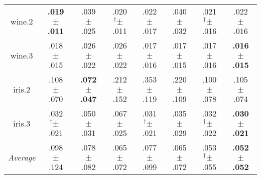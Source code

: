 \begin{tabular}{|c|ccccccc|}
wine.2 & \textbf{.019$^{\phantom{\dag}}\pm^{\phantom{\dag}}$.011}\cellcolor{green!40} & .039$^{\phantom{\dag}}\pm^{\phantom{\dag}}$.025\cellcolor{red!35} & .020$^{\dag}\pm^{\phantom{\dag}}$.011\cellcolor{green!35} & .022$^{\phantom{\dag}}\pm^{\phantom{\dag}}$.017\cellcolor{green!29} & .040$^{\phantom{\dag}}\pm^{\phantom{\dag}}$.032\cellcolor{red!40} & .021$^{\dag}\pm^{\phantom{\dag}}$.016\cellcolor{green!30} & .022$^{\phantom{\dag}}\pm^{\phantom{\dag}}$.016\cellcolor{green!27} \\
wine.3 & .018$^{\phantom{\dag}}\pm^{\phantom{\dag}}$.015\cellcolor{green!17} & .026$^{\phantom{\dag}}\pm^{\phantom{\dag}}$.022\cellcolor{red!40} & .026$^{\phantom{\dag}}\pm^{\phantom{\dag}}$.022\cellcolor{red!40} & .017$^{\phantom{\dag}}\pm^{\phantom{\dag}}$.016\cellcolor{green!26} & .017$^{\phantom{\dag}}\pm^{\phantom{\dag}}$.015\cellcolor{green!26} & .017$^{\phantom{\dag}}\pm^{\phantom{\dag}}$.016\cellcolor{green!26} & \textbf{.016$^{\phantom{\dag}}\pm^{\phantom{\dag}}$.015}\cellcolor{green!40} \\
iris.2 & .108$^{\phantom{\dag}}\pm^{\phantom{\dag}}$.070\cellcolor{green!29} & \textbf{.072$^{\phantom{\dag}}\pm^{\phantom{\dag}}$.047}\cellcolor{green!40} & .212$^{\phantom{\dag}}\pm^{\phantom{\dag}}$.152\cellcolor{green!0} & .353$^{\phantom{\dag}}\pm^{\phantom{\dag}}$.119\cellcolor{red!40} & .220$^{\phantom{\dag}}\pm^{\phantom{\dag}}$.109\cellcolor{red!2} & .100$^{\phantom{\dag}}\pm^{\phantom{\dag}}$.078\cellcolor{green!32} & .105$^{\phantom{\dag}}\pm^{\phantom{\dag}}$.074\cellcolor{green!30} \\
iris.3 & .032$^{\dag}\pm^{\phantom{\dag}}$.021\cellcolor{green!37} & .050$^{\phantom{\dag}}\pm^{\phantom{\dag}}$.031\cellcolor{red!3} & .067$^{\phantom{\dag}}\pm^{\phantom{\dag}}$.025\cellcolor{red!40} & .031$^{\dag}\pm^{\phantom{\dag}}$.021\cellcolor{green!38} & .035$^{\phantom{\dag}}\pm^{\phantom{\dag}}$.029\cellcolor{green!28} & .032$^{\dag}\pm^{\phantom{\dag}}$.022\cellcolor{green!37} & \textbf{.030$^{\phantom{\dag}}\pm^{\phantom{\dag}}$.021}\cellcolor{green!40} \\\hline
\textit{Average} & .098$^{\phantom{\dag}}\pm^{\phantom{\dag}}$.124\cellcolor{red!40} & .078$^{\phantom{\dag}}\pm^{\phantom{\dag}}$.082\cellcolor{red!4} & .065$^{\phantom{\dag}}\pm^{\phantom{\dag}}$.072\cellcolor{green!17} & .077$^{\phantom{\dag}}\pm^{\phantom{\dag}}$.099\cellcolor{red!4} & .065$^{\phantom{\dag}}\pm^{\phantom{\dag}}$.072\cellcolor{green!16} & .053$^{\dag}\pm^{\phantom{\dag}}$.055\cellcolor{green!37} & \textbf{.052$^{\phantom{\dag}}\pm^{\phantom{\dag}}$.052}\cellcolor{green!40} \\\hline
\end{tabular}